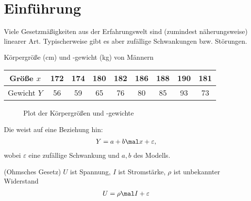 
\setcounter{chapter}{1}
\section{Einführung}

Viele Gesetzmäßigkeiten aus der Erfahrungswelt sind (zumindest näherungsweise) linearer Art.
Typischerweise gibt es aber zufällige Schwankungen bzw. Störungen.

\begin{beispiel}\label{beispiel:1.1}
	Körpergröße (cm) und -gewicht (kg) von Männern\\
	\begin{tabular}{c|cccccccc}
		Größe $x$ & 172 & 174 & 180 & 182 & 186 & 188 & 190 & 181\\ 
		\hline
		Gewicht $Y$ & 56 & 59 & 65 & 76 & 80 & 85 & 93 & 73
	\end{tabular}
	
	\begin{figure}[H]
		\begin{center}
			\newcommand{\sizeX}{5}
			\newcommand{\sizeY}{1}
			
			\caption{Plot der Körpergrößen und -gewichte}
			\label{Abb:beispiel1.1}
		\end{center}
	\end{figure}

	Die  weist auf eine  Beziehung hin:
	\begin{align*}
		Y=a+b\mal x+\varepsilon,
	\end{align*}
	wobei $\varepsilon$ eine zufällige Schwankung und $a,b$  des Modells.
\end{beispiel}

\begin{beispiel}(Ohmsches Gesetz)\label{beispiel:1.2}\enter
	$U$ ist Spannung, $I$ ist Stromstärke, $\rho$ ist unbekannter Widerstand
	\begin{align*}
		U=\rho\mal I+\varepsilon
	\end{align*}
\end{beispiel}

